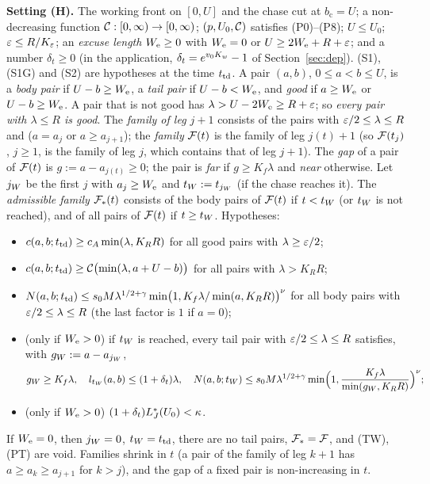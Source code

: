 \medskip\noindent{}\textbf{Setting (H).} The working front on $[0,U]$ and the chase cut at $b_{\mathrm c}=U$;
a non-decreasing function $\mathcal C:[0,\infty)\to[0,\infty)$;
$(p,U_0,\mathcal C)$ satisfies (P0)--(P8); $U\le U_0$; $\varepsilon\le R/K_\varepsilon$; an \emph{excuse length} $W_{\mathrm e}\ge0$ with $W_{\mathrm e}=0$ or
$U\ge2W_{\mathrm e}+R+\varepsilon$; and a number $\delta_t\ge0$ (in the application, $\delta_t=e^{v_0 K_w}-1$ of
Section~\ref{sec:dep}). (S1), (S1G) and (S2) are hypotheses at the time $t_{\mathrm{td}}$. A pair $(a,b)$, $0\le a<b\le U$, is a \emph{body pair} if $U-b\ge W_{\mathrm e}$, a \emph{tail pair} if $U-b<W_{\mathrm e}$, and
\emph{good} if $a\ge W_{\mathrm e}$ or $U-b\ge W_{\mathrm e}$. A pair that is not good has $\lambda>U-2W_{\mathrm e}\ge R+\varepsilon$; so \emph{every pair with
$\lambda\le R$ is good}. The \emph{family of leg $j+1$} consists of the pairs with $\varepsilon/2\le\lambda\le R$ and ($a=a_j$ or
$a\ge a_{j+1}$); the \emph{family} $\mathcal F(t)$ is the family of leg $j(t)+1$ (so $\mathcal F(t_j)$, $j\ge1$, is the family of leg $j$, which
contains that of leg $j+1$). The \emph{gap} of a pair of $\mathcal F(t)$ is $g:=a-a_{j(t)}\ge0$; the pair is \emph{far} if $g\ge K_f\lambda$
and \emph{near} otherwise. Let $j_W$ be the first $j$ with $a_j\ge W_{\mathrm e}$ and $t_W:=t_{j_W}$ (if the chase reaches it). The
\emph{admissible family} $\mathcal F_*(t)$ consists of the body pairs of $\mathcal F(t)$ if $t<t_W$ (or $t_W$ is not reached), and of all pairs
of $\mathcal F(t)$ if $t\ge t_W$. Hypotheses:
\begin{itemize}
\item[(S1)] $c(a,b;t_{\mathrm{td}})\ge c_A\min(\lambda,K_RR)$ for all good pairs with $\lambda\ge\varepsilon/2$;
\item[(S1G)] $c(a,b;t_{\mathrm{td}})\ge\mathcal C\bigl(\min(\lambda,a+U-b)\bigr)$ for all pairs with $\lambda>K_RR$;
\item[(S2)] $N(a,b;t_{\mathrm{td}})\le s_0M\lambda^{1/2+\gamma}\min\bigl(1,K_f\lambda/\min(a,K_RR)\bigr)^\nu$ for all body pairs with
$\varepsilon/2\le\lambda\le R$ (the last factor is $1$ if $a=0$);
\item[(TW)] (only if $W_{\mathrm e}>0$) if $t_W$ is reached, every tail pair with $\varepsilon/2\le\lambda\le R$ satisfies, with $g_W:=a-a_{j_W}$,
\[
g_W\ge K_f\lambda,\quad l_{t_W}(a,b)\le(1+\delta_t)\lambda,\quad
N(a,b;t_W)\le s_0M\lambda^{1/2+\gamma}\min\Bigl(1,\frac{K_f\lambda}{\min(g_W,K_RR)}\Bigr)^{\nu};
\]
\item[(PT)] (only if $W_{\mathrm e}>0$) $(1+\delta_t)L^*_J(U_0)<\kappa$.
\end{itemize}
If $W_{\mathrm e}=0$, then $j_W=0$, $t_W=t_{\mathrm{td}}$, there are no tail pairs, $\mathcal F_*=\mathcal F$, and (TW), (PT) are void. Families shrink in $t$ (a pair
of the family of leg $k+1$ has $a\ge a_k\ge a_{j+1}$ for $k>j$), and the gap of a fixed pair is non-increasing in $t$.

